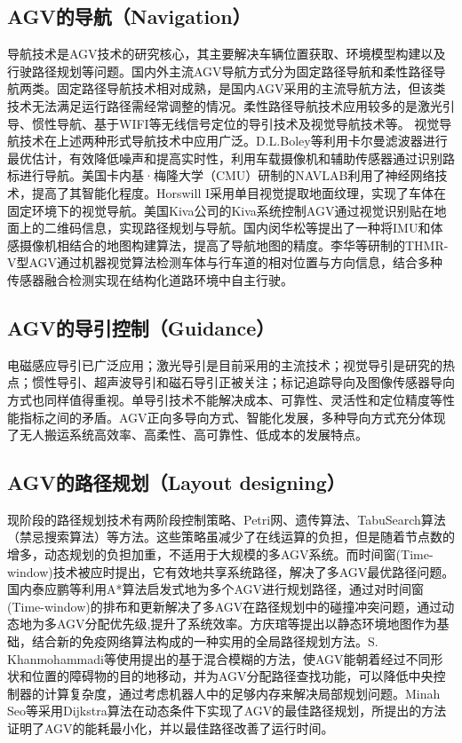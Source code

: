 \documentclass[cs4size,a4paper]{ctexart}
\numberwithin{equation}{section}
\numberwithin{table}{section}
\numberwithin{figure}{section}
\begin{document}
\subsection{AGV的导航（Navigation）}
导航技术是AGV技术的研究核心，其主要解决车辆位置获取、环境模型构建以及行驶路径规划等问题。国内外主流AGV导航方式分为固定路径导航和柔性路径导航两类。固定路径导航技术相对成熟，是国内AGV采用的主流导航方法，但该类技术无法满足运行路径需经常调整的情况。柔性路径导航技术应用较多的是激光引导、惯性导航、基于WIFI等无线信号定位的导引技术及视觉导航技术等。
视觉导航技术在上述两种形式导航技术中应用广泛。D.L.Boley等利用卡尔曼滤波器进行最优估计，有效降低噪声和提高实时性，利用车载摄像机和辅助传感器通过识别路标进行导航。美国卡内基·梅隆大学（CMU）研制的NAVLAB利用了神经网络技术，提高了其智能化程度。Horswill I采用单目视觉提取地面纹理，实现了车体在固定环境下的视觉导航。美国Kiva公司的Kiva系统控制AGV通过视觉识别贴在地面上的二维码信息，实现路径规划与导航。国内闵华松等提出了一种将IMU和体感摄像机相结合的地图构建算法，提高了导航地图的精度。李华等研制的THMR-V型AGV通过机器视觉算法检测车体与行车道的相对位置与方向信息，结合多种传感器融合检测实现在结构化道路环境中自主行驶。

\subsection{AGV的导引控制（Guidance）}
电磁感应导引已广泛应用；激光导引是目前采用的主流技术；视觉导引是研究的热点；惯性导引、超声波导引和磁石导引正被关注；标记追踪导向及图像传感器导向方式也同样值得重视。单导引技术不能解决成本、可靠性、灵活性和定位精度等性能指标之间的矛盾。AGV正向多导向方式、智能化发展，多种导向方式充分体现了无人搬运系统高效率、高柔性、高可靠性、低成本的发展特点。

\subsection{AGV的路径规划（Layout designing）}
现阶段的路径规划技术有两阶段控制策略、Petri网、遗传算法、TabuSearch算法（禁忌搜索算法）等方法。这些策略虽减少了在线运算的负担，但是随着节点数的增多，动态规划的负担加重，不适用于大规模的多AGV系统。而时间窗(Time-window)技术被应时提出，它有效地共享系统路径，解决了多AGV最优路径问题。
国内泰应鹏等利用A*算法启发式地为多个AGV进行规划路径，通过对时间窗(Time-window)的排布和更新解决了多AGV在路径规划中的碰撞冲突问题，通过动态地为多AGV分配优先级,提升了系统效率。方庆琯等提出以静态环境地图作为基础，结合新的免疫网络算法构成的一种实用的全局路径规划方法。S. Khanmohammadi等使用提出的基于混合模糊的方法，使AGV能朝着经过不同形状和位置的障碍物的目的地移动，并为AGV分配路径查找功能，可以降低中央控制器的计算复杂度，通过考虑机器人中的足够内存来解决局部规划问题。Minah Seo等采用Dijkstra算法在动态条件下实现了AGV的最佳路径规划，所提出的方法证明了AGV的能耗最小化，并以最佳路径改善了运行时间。
\end{document}
